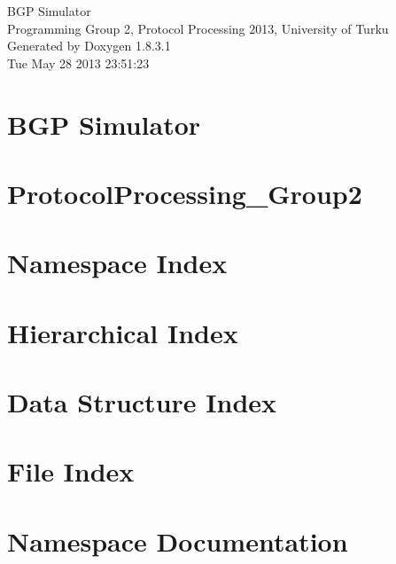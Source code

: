 \documentclass{book}
\begin{document}
\hypersetup{pageanchor=false,citecolor=blue}
\begin{titlepage}
\vspace*{7cm}
\begin{center}
{\Large B\-G\-P Simulator \\[1ex]\large Programming Group 2, Protocol Processing 2013, University of Turku }\\
\vspace*{1cm}
{\large Generated by Doxygen 1.8.3.1}\\
\vspace*{0.5cm}
{\small Tue May 28 2013 23:51:23}\\
\end{center}
\end{titlepage}
\clearemptydoublepage
{}
\tableofcontents
\clearemptydoublepage
{}
\hypersetup{pageanchor=true,citecolor=blue}
\chapter{B\-G\-P Simulator}
\label{index}\hypertarget{index}{}
\chapter{Protocol\-Processing\-\_\-\-Group2}
\label{md_README}
\hypertarget{md_README}{}

\chapter{Namespace Index}

\chapter{Hierarchical Index}

\chapter{Data Structure Index}

\chapter{File Index}

\chapter{Namespace Documentation}


\end{document}
